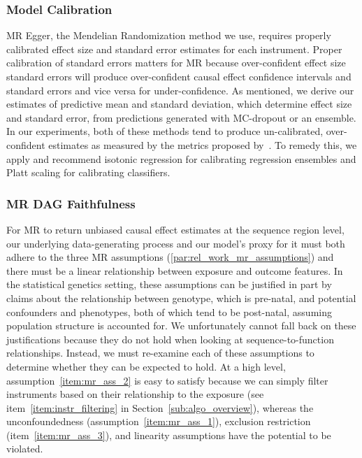 \subsubsection{Model Calibration}%
\label{ssub:meth_model_calibration}
MR Egger, the Mendelian Randomization method we use, requires properly calibrated effect size and standard error estimates for each instrument. Proper calibration of standard errors matters for MR because over-confident effect size standard errors will produce over-confident causal effect confidence intervals and standard errors and vice versa for under-confidence. As mentioned, we derive our estimates of predictive mean and standard deviation, which determine effect size and standard error, from predictions generated with MC-dropout or an ensemble. In our experiments, both of these methods tend to produce un-calibrated, over-confident estimates as measured by the metrics proposed by~\cite{kuleshov2018accurate}. To remedy this, we apply and recommend isotonic regression for calibrating regression ensembles and Platt scaling for calibrating classifiers.

\subsubsection{MR DAG Faithfulness}%
\label{ssub:mr_dag_faithfulness}
For MR to return unbiased causal effect estimates at the sequence region level, our underlying data-generating process and our model's proxy for it must both adhere to the three MR assumptions (\ref{par:rel_work_mr_assumptions}) and there must be a linear relationship between exposure and outcome features. In the statistical genetics setting, these assumptions can be justified in part by claims about the relationship between genotype, which is pre-natal, and potential confounders and phenotypes, both of which tend to be post-natal, assuming population structure is accounted for. We unfortunately cannot fall back on these justifications because they do not hold when looking at sequence-to-function relationships. Instead, we must re-examine each of these assumptions to determine whether they can be expected to hold. At a high level, assumption~\ref{item:mr_ass_2} is easy to satisfy because we can simply filter instruments based on their relationship to the exposure (see item~\ref{item:instr_filtering} in Section~\ref{sub:algo_overview}), whereas the unconfoundedness (assumption~\ref{item:mr_ass_1}), exclusion restriction (item~\ref{item:mr_ass_3}), and linearity assumptions have the potential to be violated.

